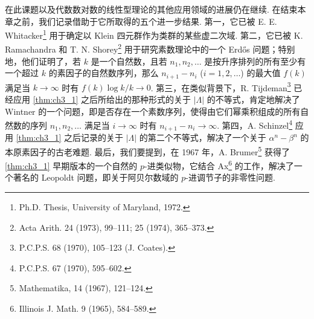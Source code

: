 在此课题以及代数数对数的线性型理论的其他应用领域的进展仍在继续. 在结束本章之前，我们记录借助于它所取得的五个进一步结果. 第一，它已被 E. E. Whitacker\footnote{Ph.D. Thesis, University of Maryland, 1972.} 用于确定以 Klein 四元群作为类群的某些虚二次域. 第二，它已被 K. Ramachandra 和 T. N. Shorey\footnote{Acta Arith. 24 (1973), 99--111; 25 (1974), 365--373.} 用于研究素数理论中的一个 Erdős 问题；特别地，他们证明了，若 $k$ 是一个自然数，且若 $n_1, n_2, \dots$ 是按升序排列的所有至少有一个超过 $k$ 的素因子的自然数序列，那么 $n_{i+1} - n_i$ ($i = 1, 2, \dots$) 的最大值 $f(k)$ 满足当 $k \to \infty$ 时有 $f(k) \log k/k \to 0$. 第三，在类似背景下，R. Tijdeman\footnote{P.C.P.S. 68 (1970), 105--123 (J. Coates).} 已经应用 \autoref{thm:ch3_1} 之后所给出的那种形式的关于 $|\Lambda|$ 的不等式，肯定地解决了 Wintner 的一个问题，即是否存在一个素数序列，使得由它们幂乘积组成的所有自然数的序列 $n_1, n_2, \dots$ 满足当 $i \to \infty$ 时有 $n_{i+1} - n_i \to \infty$. 第四，A. Schinzel\footnote{P.C.P.S. 67 (1970), 595--602.} 应用 \autoref{thm:ch3_1} 之后记录的关于 $|\Lambda|$ 的第二个不等式，解决了一个关于 $\alpha^n - \beta^n$ 的本原素因子的古老难题. 最后，我们要提到，在 1967 年，A. Brumer\footnote{Mathematika, 14 (1967), 121--124.} 获得了 \autoref{thm:ch3_1} 早期版本的一个自然的 $p$-进类似物，它结合 Ax\footnote{Illinois J. Math. 9 (1965), 584--589.} 的工作，解决了一个著名的 Leopoldt 问题，即关于阿贝尔数域的 $p$-进调节子的非零性问题.

